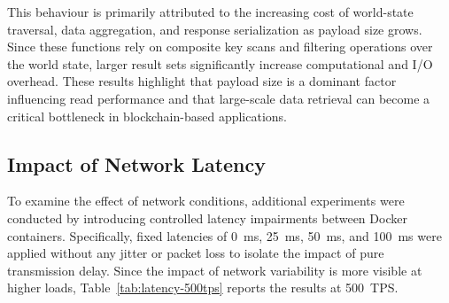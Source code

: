 \documentclass[manuscript,screen]{acmart}
\begin{document}
This behaviour is primarily attributed to the increasing cost of world-state traversal, data aggregation, and response serialization as payload size grows. Since these functions rely on composite key scans and filtering operations over the world state, larger result sets significantly increase computational and I/O overhead. These results highlight that payload size is a dominant factor influencing read performance and that large-scale data retrieval can become a critical bottleneck in blockchain-based applications.

\begin{table}[h]
	\centering
	\caption{Performance Results for Retrieval Functions at 100 TPS under Varying Payload Sizes}
	\label{tab:retrieval-combined}
\end{table}
\subsection{Impact of Network Latency}

To examine the effect of network conditions, additional experiments were conducted by introducing controlled latency impairments between Docker containers. Specifically, fixed latencies of 0~ms, 25~ms, 50~ms, and 100~ms were applied without any jitter or packet loss to isolate the impact of pure transmission delay. Since the impact of network variability is more visible at higher loads, Table~\ref{tab:latency-500tps} reports the results at 500~TPS.
\end{document}
